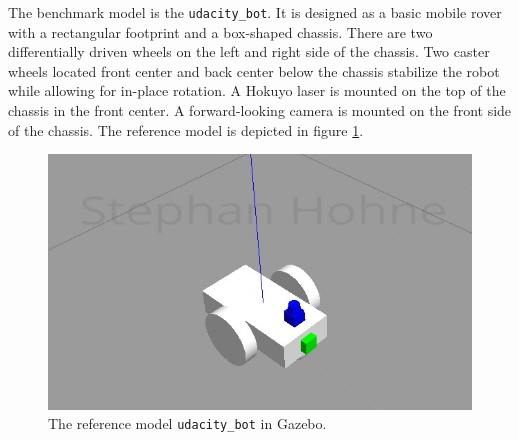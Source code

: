\documentclass[10pt,journal,compsoc]{IEEEtran}
\begin{document}
The benchmark model is the \texttt{udacity\_bot}. It is designed as a basic mobile rover with a rectangular footprint and a box-shaped chassis. There are two differentially driven wheels on the left and right side of the chassis. Two caster wheels located front center and back center below the chassis stabilize the robot while allowing for in-place rotation. A Hokuyo laser is mounted on the top of the chassis in the front center. A forward-looking camera is mounted on the front side of the chassis. The reference model is depicted in figure \ref{fig:udacity_bot}.
\begin{figure}[htpb]
      \centering
      \includegraphics[width=\linewidth]{images/udacity_bot_gazebo_signed.PNG}
      \caption{The reference model \texttt{udacity\_bot} in Gazebo.}
      \label{fig:udacity_bot}
\end{figure}
\end{document}
